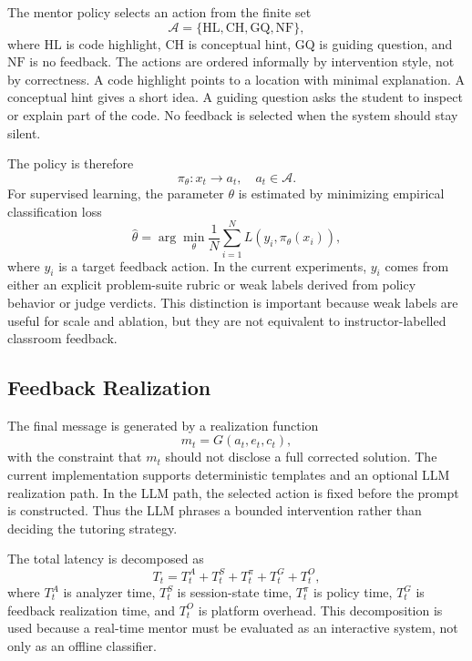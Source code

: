 \documentclass[twoside, 11pt]{article}
\begin{document}
The mentor policy selects an action from the finite set
\begin{equation}
\mathcal{A} =
\{\mathrm{HL}, \mathrm{CH}, \mathrm{GQ}, \mathrm{NF}\},
\end{equation}
where $\mathrm{HL}$ is code highlight, $\mathrm{CH}$ is conceptual hint, $\mathrm{GQ}$ is guiding question, and $\mathrm{NF}$ is no feedback. The actions are ordered informally by intervention style, not by correctness. A code highlight points to a location with minimal explanation. A conceptual hint gives a short idea. A guiding question asks the student to inspect or explain part of the code. No feedback is selected when the system should stay silent.

The policy is therefore
\begin{equation}
\pi_{\theta}: x_t \rightarrow a_t,\quad a_t \in \mathcal{A}.
\end{equation}
For supervised learning, the parameter $\theta$ is estimated by minimizing empirical classification loss
\begin{equation}
\hat{\theta} =
\arg \min_{\theta}
\frac{1}{N}\sum_{i=1}^{N} L(y_i,\pi_{\theta}(x_i)),
\end{equation}
where $y_i$ is a target feedback action. In the current experiments, $y_i$ comes from either an explicit problem-suite rubric or weak labels derived from policy behavior or judge verdicts. This distinction is important because weak labels are useful for scale and ablation, but they are not equivalent to instructor-labelled classroom feedback.

\subsection{Feedback Realization}

The final message is generated by a realization function
\begin{equation}
m_t = G(a_t,e_t,c_t),
\end{equation}
with the constraint that $m_t$ should not disclose a full corrected solution. The current implementation supports deterministic templates and an optional LLM realization path. In the LLM path, the selected action is fixed before the prompt is constructed. Thus the LLM phrases a bounded intervention rather than deciding the tutoring strategy.

The total latency is decomposed as
\begin{equation}
T_t = T^{A}_t + T^{S}_t + T^{\pi}_t + T^{G}_t + T^{O}_t,
\end{equation}
where $T^{A}_t$ is analyzer time, $T^{S}_t$ is session-state time, $T^{\pi}_t$ is policy time, $T^{G}_t$ is feedback realization time, and $T^{O}_t$ is platform overhead. This decomposition is used because a real-time mentor must be evaluated as an interactive system, not only as an offline classifier.
\end{document}
